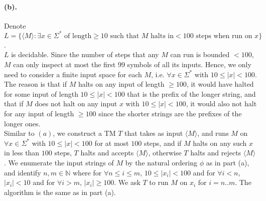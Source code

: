 \documentclass[12pt]{article}
\begin{document}
\paragraph*{(b).} Denote \(L = \{\langle M \rangle : \exists x \in \Sigma^* \text{ of length} \geq 10 \text{ such that } M \text{ halts in} < 100 \text{ steps when run on } x\}\).\\
\(L\) is decidable. Since the number of steps that any \(M\) can run is bounded \(< 100\), \(M\) can only inspect at most the first 99 symbols of all its inputs. Hence, we only need to consider a finite input space for each \(M\), i.e. \(\forall x \in \Sigma^*\) with \(10 \leq |x| < 100\). The reason is that if \(M\) halts on any input of length \(\geq 100\), it would have halted for some input of length \(10 \leq |x| < 100\) that is the prefix of the longer string, and that if \(M\) does not halt on any input \(x\) with \(10 \leq |x| < 100\), it would also not halt for any input of length \(\geq 100\) since the shorter strings are the prefixes of the longer ones. \\
Similar to \((a)\), we construct a TM \(T\) that takes as input \(\langle M \rangle\), and runs \(M\) on \(\forall x \in \Sigma^*\) with \(10 \leq |x| < 100\) for at most \(100\) steps, and if \(M\) halts on any such \(x\) in less than \(100\) steps, \(T\) halts and accepts \(\langle M \rangle\), otherwise \(T\) halts and rejects \(\langle M \rangle\). We enumerate the input strings of \(M\) by the natural ordering \(\phi\) as in part (a), and identify \(n, m \in \mathbb{N}\) where for \(\forall n\leq i \leq m\), \(10 \leq |x_i| < 100\) and for \(\forall i < n\), \(|x_i| < 10\) and for \(\forall i > m\), \(|x_i| \geq 100\). We ask \(T\) to run \(M\) on \(x_i\) for \(i = n .. m\). The algorithm is the same as in part (a).
\end{document}
